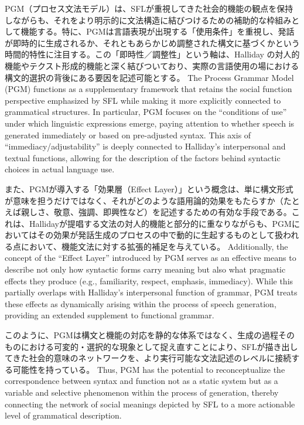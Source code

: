 \ifJPN
PGM（プロセス文法モデル）は、SFLが重視してきた社会的機能の観点を保持しながらも、それをより明示的に文法構造に結びつけるための補助的な枠組みとして機能する。特に、PGMは言語表現が出現する「使用条件」を重視し、発話が即時的に生成されるか、それともあらかじめ調整された構文に基づくかという時間的特性に注目する。この「即時性／調整性」という軸は、Halliday の対人的機能やテクスト形成的機能と深く結びついており、実際の言語使用の場における構文的選択の背後にある要因を記述可能とする。
\else
The Process Grammar Model (PGM) functions as a supplementary framework that retains the social function perspective emphasized by SFL while making it more explicitly connected to grammatical structures. In particular, PGM focuses on the ``conditions of use'' under which linguistic expressions emerge, paying attention to whether speech is generated immediately or based on pre-adjusted syntax. This axis of ``immediacy/adjustability'' is deeply connected to Halliday's interpersonal and textual functions, allowing for the description of the factors behind syntactic choices in actual language use.
\fi

\ifJPN
また、PGMが導入する「効果層（Effect Layer）」という概念は、単に構文形式が意味を担うだけではなく、それがどのような語用論的効果をもたらすか（たとえば親しさ、敬意、強調、即興性など）を記述するための有効な手段である。これは、Hallidayが提唱する文法の対人的機能と部分的に重なりながらも、PGMにおいてはその効果が発話生成のプロセスの中で動的に生起するものとして扱われる点において、機能文法に対する拡張的補足を与えている。
\else
Additionally, the concept of the ``Effect Layer'' introduced by PGM serves as an effective means to describe not only how syntactic forms carry meaning but also what pragmatic effects they produce (e.g., familiarity, respect, emphasis, immediacy). While this partially overlaps with Halliday's interpersonal function of grammar, PGM treats these effects as dynamically arising within the process of speech generation, providing an extended supplement to functional grammar.
\fi

\ifJPN
このように、PGMは構文と機能の対応を静的な体系ではなく、生成の過程そのものにおける可変的・選択的な現象として捉え直すことにより、SFLが描き出してきた社会的意味のネットワークを、より実行可能な文法記述のレベルに接続する可能性を持っている。
\else
Thus, PGM has the potential to reconceptualize the correspondence between syntax and function not as a static system but as a variable and selective phenomenon within the process of generation, thereby connecting the network of social meanings depicted by SFL to a more actionable level of grammatical description.
\fi




